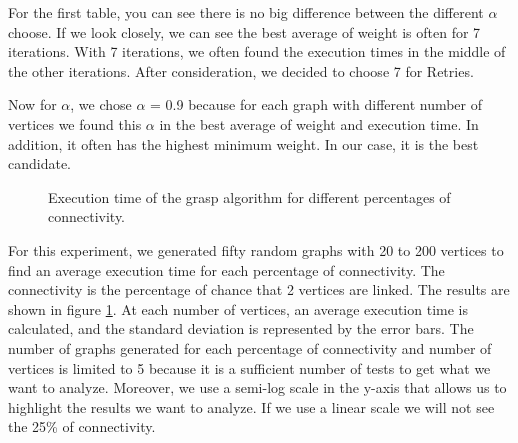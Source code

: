 For the first table, you can see there is no big difference between the different $\alpha$ choose.
If we look closely, we can see the best average of weight is often for 7 iterations.
With 7 iterations, we often found the execution times in the middle of the other iterations.
After consideration, we decided to choose 7 for Retries. 
\bigskip

Now for $\alpha$, we chose $\alpha$ = 0.9 because for each graph with different number of vertices we found this $\alpha$ in the best average of weight and execution time.
In addition, it often has the highest  minimum weight. In our case, it is the best candidate.


\begin{figure}[H]
    \centering
    \caption{Execution time of the grasp algorithm for different percentages of connectivity.}
    \label{fig:grasp_time}
\end{figure}

For this experiment, we generated fifty random graphs with 20 to 200 vertices to
find an average execution time for each percentage of connectivity. The connectivity is the percentage of chance that 2 vertices are linked. The results
are shown in figure \ref{fig:grasp_time}. At each number of vertices, an average
execution time is calculated, and the standard deviation is represented by the
error bars. The number of graphs generated for each
percentage of connectivity and number of vertices is limited to 5 because it is a sufficient
number of tests to get what we want to analyze. Moreover, we use a semi-log scale in the y-axis that allows
us to highlight the results we want to analyze. If we use a linear scale we will not see the 25\% of connectivity.

